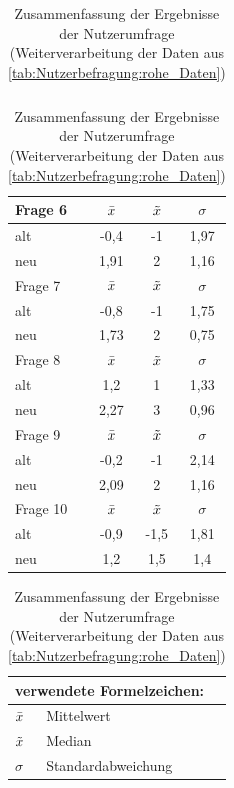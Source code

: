 \begin{table}[H]
\begin{tabular}{|l|c|c|c|}
\end{tabular}
\begin{tabular}{|l|c|c|c|}
\hline
Frage 6   & $\Bar{x}$ & $\Tilde{x}$ & $\sigma$ \\ \hline
alt       & -0,4      &  -1         &  1,97    \\ \hline
neu       & 1,91      &  2          &  1,16    \\ \hline
\hline
Frage 7   & $\Bar{x}$ & $\Tilde{x}$ & $\sigma$ \\ \hline
alt       & -0,8      &  -1         &  1,75    \\ \hline
neu       & 1,73      &  2          &  0,75    \\ \hline
\hline
Frage 8   & $\Bar{x}$ & $\Tilde{x}$ & $\sigma$ \\ \hline
alt       & 1,2       &  1         &  1,33    \\ \hline
neu       & 2,27      &  3         &  0,96    \\ \hline
\hline
Frage 9   & $\Bar{x}$ & $\Tilde{x}$ & $\sigma$ \\ \hline
alt       & -0,2      &  -1         &  2,14    \\ \hline
neu       & 2,09      &  2          &  1,16    \\ \hline
\hline
Frage 10   & $\Bar{x}$ & $\Tilde{x}$ & $\sigma$ \\ \hline
alt       & -0,9       &  -1,5       &  1,81    \\ \hline
neu       & 1,2        &  1,5        &  1,4    \\ \hline
\end{tabular}

\begin{tabular}{ll}
\multicolumn{2}{l}{verwendete Formelzeichen:} \\ \hline
$\Bar{x}$          & Mittelwert               \\
$\Tilde{x}$        & Median                   \\
$\sigma$           & Standardabweichung      
\end{tabular}
\caption{Zusammenfassung der Ergebnisse der Nutzerumfrage (Weiterverarbeitung der Daten aus \autoref{tab:Nutzerbefragung:rohe_Daten})}
\label{tab:Nutzerbefragung:mittelwerte}
\end{table}